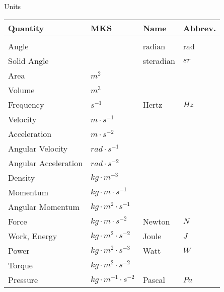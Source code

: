 %
%
%

\begin{section}{Units}
  \begin{tabular}{l l l l}
    Quantity & MKS & Name & Abbrev.\\
    \hline \\
    Angle &  & radian & rad \\
    Solid Angle & & steradian & $sr$ \\
    Area & $m^2$ & & \\
    Volume & $m^3$ & & \\
    Frequency & $s^{-1}$ & Hertz & $Hz$\\
    Velocity & $m \cdot s^{-1}$ & & \\
    Acceleration & $m \cdot s^{-2}$ & & \\
    Angular Velocity & $rad \cdot s^{-1}$ & & \\
    Angular Acceleration & $rad \cdot s^{-2}$  & & \\
    Density & $kg \cdot m^{-3}$ & & \\
    Momentum & $kg \cdot m \cdot s^{-1}$  & & \\
    Angular Momentum & $kg \cdot m^2 \cdot s^{-1}$ & & \\
    Force & $kg \cdot m \cdot s^{-2}$ & Newton & $N$ \\
    Work, Energy & $kg \cdot m^2 \cdot s^{-2}$ & Joule & $J$ \\
    Power & $kg \cdot m^2 \cdot s^{-3}$ & Watt & $W$ \\
    Torque & $kg \cdot m^2 \cdot s^{-2}$ & & \\
    Pressure & $kg \cdot m^{-1} \cdot s^{-2}$  & Pascal & $Pa$ \\
  \end{tabular}
\end{section}

